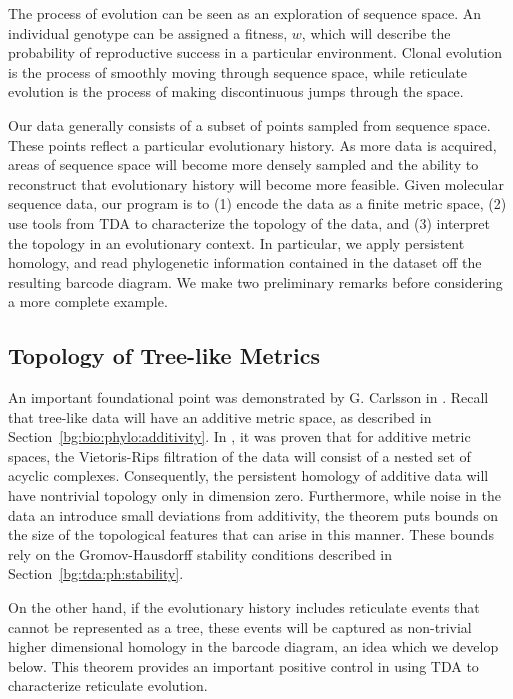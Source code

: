 The process of evolution can be seen as an exploration of sequence space.
An individual genotype can be assigned a fitness, $w$, which will describe the probability of reproductive success in a particular environment.
Clonal evolution is the process of smoothly moving through sequence space, while reticulate evolution is the process of making discontinuous jumps through the space.

Our data generally consists of a subset of points sampled from sequence space.
These points reflect a particular evolutionary history.
As more data is acquired, areas of sequence space will become more densely sampled and the ability to reconstruct that evolutionary history will become more feasible.
Given molecular sequence data, our program is to (1) encode the data as a finite metric space, (2) use tools from TDA to characterize the topology of the data, and (3) interpret the topology in an evolutionary context.
In particular, we apply persistent homology, and read phylogenetic information contained in the dataset off the resulting barcode diagram.
We make two preliminary remarks before considering a more complete example.

\subsection{Topology of Tree-like Metrics}
\label{bg:top4bio:treemetrics}

An important foundational point was demonstrated by G. Carlsson in \cite{Chan:2013}.
Recall that tree-like data will have an additive metric space, as described in Section~\ref{bg:bio:phylo:additivity}.
In \cite{Chan:2013}, it was proven that for additive metric spaces, the Vietoris-Rips filtration of the data will consist of a nested set of acyclic complexes.
Consequently, the persistent homology of additive data will have nontrivial topology only in dimension zero.
Furthermore, while noise in the data an introduce small deviations from additivity, the theorem puts bounds on the size of the topological features that can arise in this manner.
These bounds rely on the Gromov-Hausdorff stability conditions described in Section~\ref{bg:tda:ph:stability}.

On the other hand, if the evolutionary history includes reticulate events that cannot be represented as a tree, these events will be captured as non-trivial higher dimensional homology in the barcode diagram, an idea which we develop below.
This theorem provides an important positive control in using TDA to characterize reticulate evolution.

